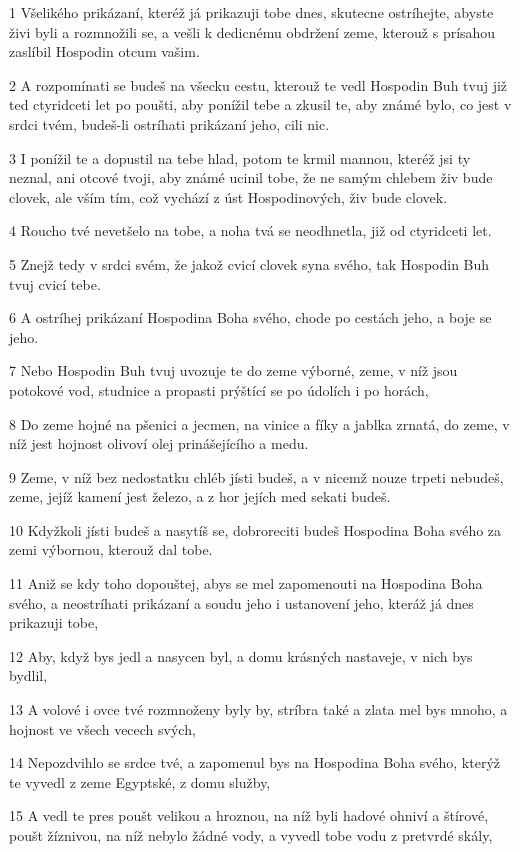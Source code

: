 \par 1 Všelikého prikázaní, kteréž já prikazuji tobe dnes, skutecne ostríhejte, abyste živi byli a rozmnožili se, a vešli k dedicnému obdržení zeme, kterouž s prísahou zaslíbil Hospodin otcum vašim.
\par 2 A rozpomínati se budeš na všecku cestu, kterouž te vedl Hospodin Buh tvuj již ted ctyridceti let po poušti, aby ponížil tebe a zkusil te, aby známé bylo, co jest v srdci tvém, budeš-li ostríhati prikázaní jeho, cili nic.
\par 3 I ponížil te a dopustil na tebe hlad, potom te krmil mannou, kteréž jsi ty neznal, ani otcové tvoji, aby známé ucinil tobe, že ne samým chlebem živ bude clovek, ale vším tím, což vychází z úst Hospodinových, živ bude clovek.
\par 4 Roucho tvé nevetšelo na tobe, a noha tvá se neodhnetla, již od ctyridceti let.
\par 5 Znejž tedy v srdci svém, že jakož cvicí clovek syna svého, tak Hospodin Buh tvuj cvicí tebe.
\par 6 A ostríhej prikázaní Hospodina Boha svého, chode po cestách jeho, a boje se jeho.
\par 7 Nebo Hospodin Buh tvuj uvozuje te do zeme výborné, zeme, v níž jsou potokové vod, studnice a propasti prýštící se po údolích i po horách,
\par 8 Do zeme hojné na pšenici a jecmen, na vinice a fíky a jablka zrnatá, do zeme, v níž jest hojnost olivoví olej prinášejícího a medu.
\par 9 Zeme, v níž bez nedostatku chléb jísti budeš, a v nicemž nouze trpeti nebudeš, zeme, jejíž kamení jest železo, a z hor jejích med sekati budeš.
\par 10 Kdyžkoli jísti budeš a nasytíš se, dobroreciti budeš Hospodina Boha svého za zemi výbornou, kterouž dal tobe.
\par 11 Aniž se kdy toho dopouštej, abys se mel zapomenouti na Hospodina Boha svého, a neostríhati prikázaní a soudu jeho i ustanovení jeho, kteráž já dnes prikazuji tobe,
\par 12 Aby, když bys jedl a nasycen byl, a domu krásných nastaveje, v nich bys bydlil,
\par 13 A volové i ovce tvé rozmnoženy byly by, stríbra také a zlata mel bys mnoho, a hojnost ve všech vecech svých,
\par 14 Nepozdvihlo se srdce tvé, a zapomenul bys na Hospodina Boha svého, kterýž te vyvedl z zeme Egyptské, z domu služby,
\par 15 A vedl te pres poušt velikou a hroznou, na níž byli hadové ohniví a štírové, poušt žíznivou, na níž nebylo žádné vody, a vyvedl tobe vodu z pretvrdé skály,
